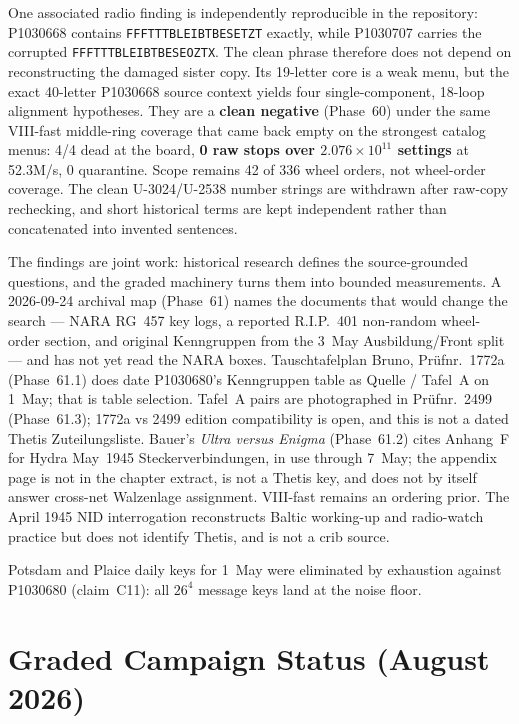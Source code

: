 \documentclass[11pt,a4paper]{article}
\begin{document}
One associated radio finding is independently reproducible in the repository:
P1030668 contains \texttt{FFFTTTBLEIBTBESETZT} exactly, while P1030707 carries
the corrupted \texttt{FFFTTTBLEIBTBESEOZTX}. The clean phrase therefore does
not depend on reconstructing the damaged sister copy. Its 19-letter core is a
weak menu, but the exact 40-letter P1030668 source context yields four
single-component, 18-loop alignment hypotheses. They are a \textbf{clean
negative} (Phase~60) under the same VIII-fast middle-ring coverage that came
back empty on the strongest catalog menus: 4/4 dead at the board,
\textbf{0 raw stops over $2.076\times10^{11}$ settings} at 52.3M/s, 0
quarantine. Scope remains 42 of 336 wheel orders, not wheel-order coverage.
The clean U-3024/U-2538 number strings
are withdrawn after raw-copy rechecking, and short historical terms are kept
independent rather than concatenated into invented sentences.

The findings are joint work: historical research defines the
source-grounded questions, and the graded machinery turns them into bounded
measurements.
A 2026-09-24 archival map (Phase~61) names the documents that would change the
search --- NARA RG~457 key logs, a reported R.I.P.~401 non-random wheel-order
section, and original Kenngruppen from the 3~May Ausbildung/Front split ---
and has not yet read the NARA boxes. Tauschtafelplan Bruno, Prüfnr.\ 1772a
(Phase~61.1) does date P1030680's Kenngruppen table as Quelle / Tafel~A on
1~May; that is table selection. Tafel~A pairs are photographed in Prüfnr.\ 2499
(Phase~61.3); 1772a vs 2499 edition compatibility is open, and this is not a
dated Thetis Zuteilungsliste. Bauer's \emph{Ultra versus Enigma} (Phase~61.2)
cites Anhang~F for Hydra May~1945 Steckerverbindungen, in use through
7~May; the appendix page is not in the chapter extract, is not a Thetis
key, and does not by itself answer cross-net Walzenlage assignment.
VIII-fast remains an ordering prior.
The April 1945 NID interrogation reconstructs Baltic working-up and radio-watch
practice but does not identify Thetis, and is not a crib source.

Potsdam and Plaice daily keys for 1~May were eliminated by exhaustion
against P1030680 (claim~C11): all $26^4$ message keys land at the noise
floor.

\section{Graded Campaign Status (August 2026)}
\end{document}
